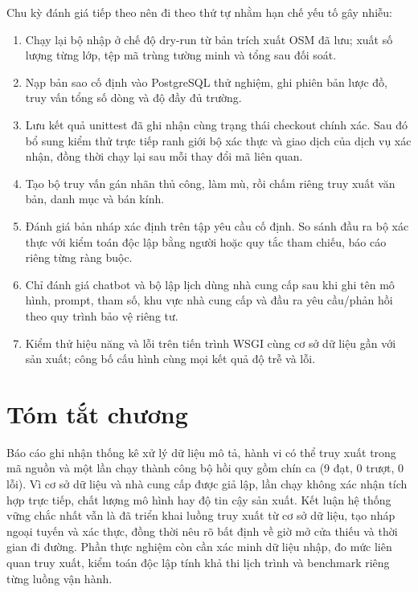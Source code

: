 Chu kỳ đánh giá tiếp theo nên đi theo thứ tự nhằm hạn chế yếu tố gây nhiễu:
\begin{enumerate}[leftmargin=1.8em,itemsep=3pt]
    \item Chạy lại bộ nhập ở chế độ dry-run từ bản trích xuất OSM đã lưu; xuất số lượng từng lớp, tệp mã trùng tường minh và tổng sau đối soát.
    \item Nạp bản sao cố định vào PostgreSQL thử nghiệm, ghi phiên bản lược đồ, truy vấn tổng số dòng và độ đầy đủ trường.
    \item Lưu kết quả unittest đã ghi nhận cùng trạng thái checkout chính xác. Sau đó bổ sung kiểm thử trực tiếp ranh giới bộ xác thực và giao dịch của dịch vụ xác nhận, đồng thời chạy lại sau mỗi thay đổi mã liên quan.
    \item Tạo bộ truy vấn gán nhãn thủ công, làm mù, rồi chấm riêng truy xuất văn bản, danh mục và bán kính.
    \item Đánh giá bản nháp xác định trên tập yêu cầu cố định. So sánh đầu ra bộ xác thực với kiểm toán độc lập bằng người hoặc quy tắc tham chiếu, báo cáo riêng từng ràng buộc.
    \item Chỉ đánh giá chatbot và bộ lập lịch dùng nhà cung cấp sau khi ghi tên mô hình, prompt, tham số, khu vực nhà cung cấp và đầu ra yêu cầu/phản hồi theo quy trình bảo vệ riêng tư.
    \item Kiểm thử hiệu năng và lỗi trên tiến trình WSGI cùng cơ sở dữ liệu gần với sản xuất; công bố cấu hình cùng mọi kết quả độ trễ và lỗi.
\end{enumerate}

\section{Tóm tắt chương}

Báo cáo ghi nhận thống kê xử lý dữ liệu mô tả, hành vi có thể truy xuất trong mã nguồn và một lần chạy thành công bộ hồi quy gồm chín ca (9 đạt, 0 trượt, 0 lỗi). Vì cơ sở dữ liệu và nhà cung cấp được giả lập, lần chạy không xác nhận tích hợp trực tiếp, chất lượng mô hình hay độ tin cậy sản xuất. Kết luận hệ thống vững chắc nhất vẫn là đã triển khai luồng truy xuất từ cơ sở dữ liệu, tạo nháp ngoại tuyến và xác thực, đồng thời nêu rõ bất định về giờ mở cửa thiếu và thời gian đi đường. Phần thực nghiệm còn cần xác minh dữ liệu nhập, đo mức liên quan truy xuất, kiểm toán độc lập tính khả thi lịch trình và benchmark riêng từng luồng vận hành.
